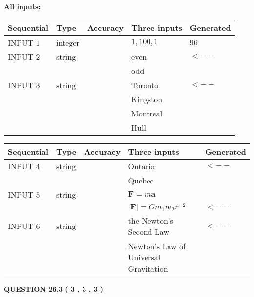 \documentclass[12pt]{article}
\begin{document}
   
   
   
\noindent\vspace{0.1in}\hspace{-0.08in} {\textbf{\Large{All inputs: }}}
   
   
  
  
\noindent\begin{tabular}{|l|l|l|l|l|}
\hline
 Sequential & Type & Accuracy & Three inputs & Generated \\ 
\hline
 
 
  INPUT $            1 $ & integer &  & $
 1
 , 
 100
 , 
 1
 $ & $ 96 $ 
 \\  \hline  
 
 
  INPUT $            2 $ & string & & 
 even & 
  $ <-- $ 
  \\
  & & & 
 odd & 
 \\  \hline  
 
 
  INPUT $            3 $ & string & & 
 Toronto & 
  $ <-- $ 
  \\
  & & & 
 Kingston & 
  \\
  & & & 
 Montreal & 
  \\
  & & & 
 Hull & 
 \\  \hline  
 \end{tabular}
   
   
  
  
\noindent\begin{tabular}{|l|l|l|l|l|}
\hline
 Sequential & Type & Accuracy & Three inputs & Generated \\ 
\hline
 
 
  INPUT $            4 $ & string & & 
 Ontario & 
  $ <-- $ 
  \\
  & & & 
 Quebec & 
 \\  \hline  
 
 
  INPUT $            5 $ & string & & 
 $\mathbf{F}=m\mathbf{a}$ & 
  \\
  & & & 
 $\left| \mathbf{F}\right| =Gm_1m_2r^{-2}$ & 
  $ <-- $ 
 \\  \hline  
 
 
  INPUT $            6 $ & string & & 
 the Newton's Second Law & 
  $ <-- $ 
  \\
  & & & 
 Newton's Law of Universal Gravitation & 
 \\  \hline  
 \end{tabular}
   
   
  
\vspace{0.2in}
  
{\textbf{\Large{QUESTION
26.3 
 (           3 ,           3 ,           3 )
}}}
  
\end{document}
